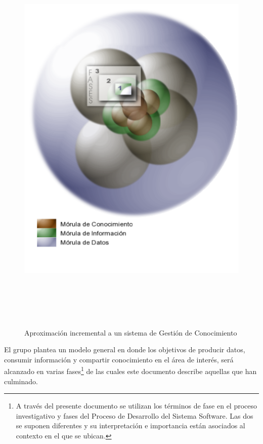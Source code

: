 \begin{figure}
 \centering
 \includegraphics[width=156mm, height=195mm]{modelo_fases.png}
 \caption{Aproximación incremental a un sistema de Gestión de Conocimiento}
 \label{modelo1}
\end{figure}

El grupo plantea un modelo general en donde los objetivos de producir datos, consumir información y compartir conocimiento en el área de interés, será alcanzado en varias fases\footnote{A través del presente documento se utilizan los términos de fase en el proceso investigativo y fases del Proceso de Desarrollo del Sistema Software. Las dos se suponen diferentes y su interpretación e importancia están asociados al contexto en el que se ubican.} de las cuales este documento describe aquellas que han culminado.

